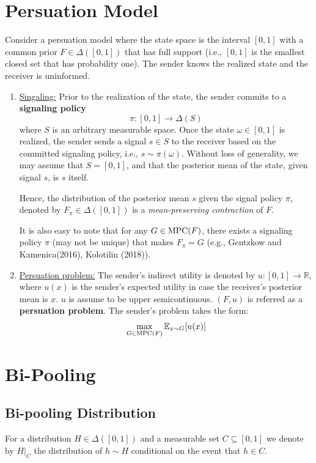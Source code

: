 \documentclass[11pt]{elegantbook}
\begin{document}
\section{Persuation Model}
Consider a persuation model where the state space is the interval $[0,1]$ with a common prior $F\in\Delta([0,1])$ that has full support (i.e., $[0,1]$ is the smallest closed set that has probability one). The sender knows the realized state and the receiver is uninformed.
\begin{enumerate}
    \item \underline{Singaling:} Prior to the realization of the state, the sender commits to a \textbf{signaling policy} $$\pi : [0, 1] \rightarrow \Delta(S)$$
    where $S$ is an arbitrary measurable space. Once the state $\omega\in[0,1]$ is realized, the sender sends a signal $s\in S$ to the receiver based on the committed signaling policy, i.e., $s \sim \pi(\omega)$. Without loss of generality, we may assume that $S=[0, 1]$, and that the posterior mean of the state, given signal $s$, is $s$ itself.
    
    Hence, the distribution of the posterior mean $s$ given the signal policy $\pi$, denoted by $F_\pi\in\Delta([0,1])$ is a \textit{mean-preserving contraction} of $F$.
    
    It is also easy to note that for any $G\in \textnormal{MPC}(F)$, there exists a signaling policy $\pi$ (may not be unique) that makes $F_\pi=G$ (e.g., Gentzkow and Kamenica(2016), Kolotilin (2018)).
    \item \underline{Persuation problem:} The sender's indirect utility is denoted by $u:[0,1] \rightarrow \mathbb{R}$, where $u(x)$ is the sender's expected utility in case the receiver's posterior mean is $x$. $u$ is assume to be upper semicontinuous. $(F,u)$ is referred as a \textbf{persuation problem}. The sender's problem takes the form:
    \begin{equation}
        \begin{aligned}
            \max_{G\in \textnormal{MPC}(F)}\mathbb{E}_{x\sim G}[u(x)]
        \end{aligned}
        \nonumber
    \end{equation}
\end{enumerate}


\section{Bi-Pooling}
\subsection{Bi-pooling Distribution}
\begin{note}
    For a distribution $H \in \Delta([0,1])$ and a measurable set $C \subseteq[0,1]$ we denote by $H|_C$ the distribution of $h \sim H$ conditional on the event that $h\in C$.
\end{note}
\end{document}
